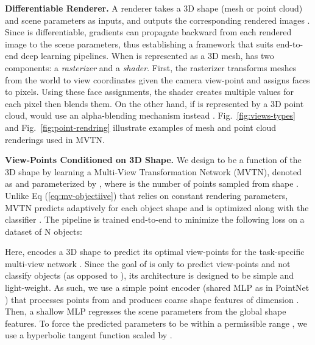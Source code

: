 \documentclass[10pt,twocolumn,letterpaper]{article}
\newcommand{\figLabel}{Fig.~}
\newcommand{\eqLabel}[1]{{Eq (#1)}}
\newcommand{\mysection}[1]{\noindent\textbf{#1.}}
\begin{document}
\vspace{1pt}\mysection{Differentiable Renderer}
A renderer  takes a 3D shape  (mesh or point cloud) and scene parameters  as inputs, and outputs the corresponding  rendered images . 
Since  is differentiable, gradients  can propagate backward from each rendered image to the scene parameters, thus establishing a framework that suits end-to-end deep learning pipelines.
When  is represented as a 3D mesh,  has two components: a \textit{rasterizer} and a \textit{shader}. First, the rasterizer transforms meshes from the world to view coordinates given the camera view-point and assigns faces to pixels. Using these face assignments, the shader creates multiple values for each pixel then blends them. On the other hand, if  is represented by a 3D point cloud,  would use an alpha-blending mechanism instead \cite{synsin}.
\figLabel{\ref{fig:views-types}} and \figLabel{\ref{fig:point-rendring}} illustrate examples of mesh and point cloud renderings used in MVTN. 

\vspace{1pt}\mysection{View-Points Conditioned on 3D Shape}
We design  to be a function of the 3D shape by learning a Multi-View Transformation Network (MVTN), denoted as  and parameterized by , where  is the number of points sampled from shape . 
Unlike \eqLabel{\ref{eq:mv-objectiive}} that relies on constant rendering parameters, MVTN predicts  adaptively for each object shape  and is optimized along with the classifier . The pipeline is trained end-to-end to minimize the following loss on a dataset of N objects:

Here,  encodes a 3D shape to predict its optimal view-points for the task-specific multi-view network . Since the goal of  is only to predict view-points and not classify objects (as opposed to ), its architecture is designed to be simple and light-weight. 
As such, we use a simple point encoder (\eg shared MLP as in PointNet \cite{pointnet}) that processes  points from  and produces coarse shape features of dimension . Then, a shallow MLP regresses the scene parameters  from the global shape features.
To force the predicted parameters  to be within a permissible range , we use a hyperbolic tangent function scaled by .
\end{document}
